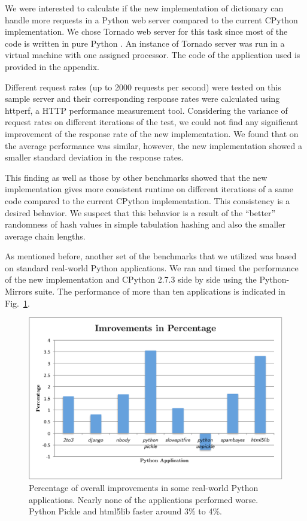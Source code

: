 \documentclass[runningheads,a4paper]{llncs}
\begin{document}
We were interested to calculate if the new implementation of dictionary can handle more requests in a Python web server compared to the current CPython implementation. We chose Tornado web server for this task since most of the code is written in pure Python \cite{wsgi}. An instance of Tornado server was run in a virtual machine with one assigned processor. The code of the application used is provided in the appendix. 

Different request rates (up to 2000 requests per second) were tested on this
sample server and their corresponding response rates were calculated using
httperf, a HTTP performance measurement tool. Considering the variance of request rates on different iterations of the test, we could not find any significant improvement of the response rate of the new implementation. We found that on the average performance was similar, however, the new implementation showed a smaller standard deviation in the response rates. 

This finding as well as those by other benchmarks showed that the new
implementation gives more consistent runtime on different iterations of a same
code compared to the current CPython implementation. This consistency is a
desired behavior. We suspect that this behavior is a result of the ``better'' randomness of hash values in simple tabulation hashing and also the smaller average chain lengths.

As mentioned before, another set of the benchmarks \cite{bench_suite} that we utilized was based on standard real-world Python applications. We ran and timed the performance of the new implementation and CPython 2.7.3 side by side using the Python-Mirrors suite. The performance of more than ten applications is indicated in Fig.~\ref{fig:suite}.

\begin{figure}[!ht]
  \centering
  \includegraphics[width=12cm]{appsbench.pdf}
  \caption{Percentage of overall improvements in some real-world Python
  applications. Nearly none of the applications performed worse. Python Pickle
  and html5lib faster around 3\% to 4\%. }
  \label{fig:suite}
\end{figure}
\end{document}
